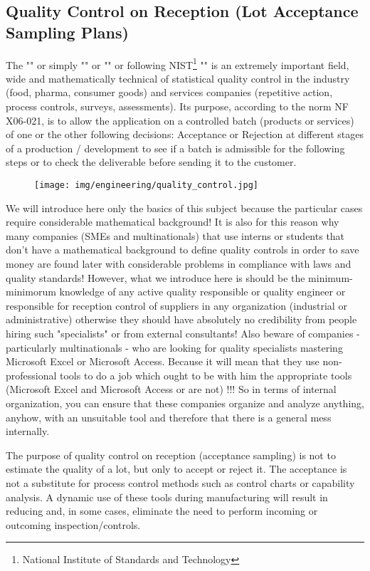 	\subsection{Quality Control on Reception (Lot Acceptance Sampling Plans)}
	The "" or simply "" or "" or following NIST\footnote{National Institute of Standards and Technology} "" is an extremely important field, wide and mathematically technical of statistical quality control in the industry (food, pharma, consumer goods) and services companies (repetitive action, process controls, surveys, assessments). Its purpose, according to the norm NF X06-021, is to allow the application on a controlled batch (products or services) of one or the other following decisions: Acceptance or Rejection at different stages of a production / development to see if a batch is admissible for the following steps or to check the deliverable  before sending it to the customer.
	\begin{figure}[H]
		\centering
		\texttt{[image: img/engineering/quality\_control.jpg]}	
	\end{figure}
	\begin{tcolorbox}[title=Remark,colframe=black,arc=10pt]
	We will introduce here only the basics of this subject because the particular cases require considerable mathematical background! It is also for this reason why many companies (SMEs and multinationals) that use interns or students that don't have a mathematical background to define quality controls in order to save money are found later with considerable problems in compliance with laws and quality standards! However, what we introduce here is should be the minimum-minimorum knowledge of any active  quality responsible or quality engineer or responsible for reception control of suppliers in any organization (industrial or administrative) otherwise they should have absolutely no credibility from people hiring such "specialists" or from external consultants! Also beware of companies - particularly multinationals - who are looking for quality specialists mastering Microsoft Excel or Microsoft Access. Because it will mean that they use non-professional tools to do a job which ought to be with him the appropriate tools (Microsoft Excel and Microsoft Access or are not) !!! So in terms of internal organization, you can ensure that these companies organize and analyze anything, anyhow, with an unsuitable tool and therefore that there is a general mess internally.
	\end{tcolorbox}
	The purpose of quality control on reception (acceptance sampling) is not to estimate the quality of a lot, but only to accept or reject it. The acceptance is not a substitute for process control methods such as control charts or capability analysis. A dynamic use of these tools during manufacturing will result in reducing and, in some cases, eliminate the need to perform incoming or outcoming inspection/controls.

